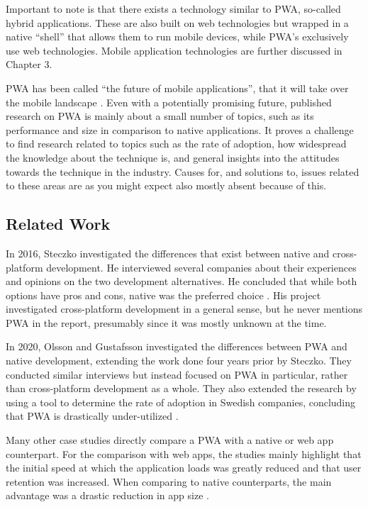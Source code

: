 \documentclass[a4paper,12pt]{article}
\begin{document}
Important to note is that there exists a technology similar to PWA, so-called hybrid applications. These are also built on web technologies but wrapped in a native “shell” that allows them to run mobile devices, while PWA’s exclusively use web technologies. Mobile application technologies are further discussed in Chapter 3.

PWA has been called “the future of mobile applications”, that it will take over the mobile landscape \cite{casestudies_mia, futureofweb_claim1}. Even with a potentially promising future, published research on PWA is mainly about a small number of topics, such as its performance and size in comparison to native applications. It proves a challenge to find research related to topics such as the rate of adoption, how widespread the knowledge about the technique is, and general insights into the attitudes towards the technique in the industry. Causes for, and solutions to, issues related to these areas are as you might expect also mostly absent because of this.

\subsection{Related Work}
\label{Intro_relatedWork}
In 2016, Steczko investigated the differences that exist between native and cross-platform development. He interviewed several companies about their experiences and opinions on the two development alternatives. He concluded that while both options have pros and cons, native was the preferred choice \cite{thesis_steczko}. His project investigated cross-platform development in a general sense, but he never mentions PWA in the report, presumably since it was mostly unknown at the time.

In 2020, Olsson and Gustafsson investigated the differences between PWA and native development, extending the work done four years prior by Steczko. They conducted similar interviews but instead focused on PWA in particular, rather than cross-platform development as a whole. They also extended the research by using a tool to determine the rate of adoption in Swedish companies, concluding that PWA is drastically under-utilized \cite{thesis_sverige}.

Many other case studies directly compare a PWA with a native or web app counterpart. For the comparison with web apps, the studies mainly highlight that the initial speed at which the application loads was greatly reduced and that user retention was increased. When comparing to native counterparts, the main advantage was a drastic reduction in app size \cite{casestudies_mia, thesis_pwa_2017, casestudies_google_1, casestudies_google_2, realize_native_with_pwa}.
\end{document}
